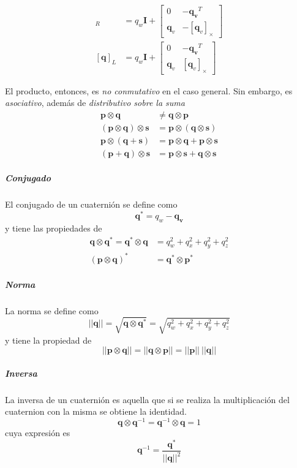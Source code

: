 \begin{align}
    [\bm{q}]_R &= q_w\bm{I} +
    \begin{bmatrix}
        0 & -\bm{q_v}^T \\
        \bm{q}_v & -[\bm{q}_v]_\times
    \end{bmatrix}
    \label{eq:quaternionproductmatrixright}
    \\
    [\bm{q}]_L &= q_w\bm{I} +
    \begin{bmatrix}
        0 & -\bm{q_v}^T \\
        \bm{q}_v & [\bm{q}_v]_\times
    \end{bmatrix}
    \label{eq:quaternionproductmatrixleft}
\end{align}

El producto, entonces, es \textit{no conmutativo} en el caso general. Sin embargo, es \textit{asociativo}, además de \textit{distributivo sobre la suma}
\begin{align}
    \bm{p}\otimes\bm{q} &\neq \bm{q}\otimes\bm{p} \\
    (\bm{p}\otimes\bm{q})\otimes\bm{s} &= \bm{p}\otimes(\bm{q}\otimes\bm{s}) \\
    \bm{p}\otimes(\bm{q} + \bm{s}) &= \bm{p}\otimes\bm{q} + \bm{p}\otimes\bm{s} \\
    (\bm{p} + \bm{q})\otimes\bm{s} &= \bm{p}\otimes\bm{s} + \bm{q}\otimes\bm{s}
\end{align}
\subparagraph{Conjugado}
El conjugado de un cuaternión se define como
\begin{equation}
    \bm{q}^* = q_w - \bm{q_v}
\end{equation}
y tiene las propiedades de
\begin{align}
    \bm{q}\otimes\bm{q}^* = \bm{q^*}\otimes\bm{q} &= q_w^2 + q_x^2 + q_y^2 + q_z^2 \\
    (\bm{p}\otimes\bm{q})^* &= \bm{q}^*\otimes\bm{p}^*
\end{align}

\subparagraph{Norma}
La norma se define como
\begin{equation}
    ||\bm{q}|| = \sqrt{\bm{q}\otimes\bm{q}^*} = \sqrt{q_w^2 + q_x^2 + q_y^2 + q_z^2}
\end{equation}
y tiene la propiedad de
\begin{equation}
    ||\bm{p}\otimes\bm{q}|| = ||\bm{q}\otimes\bm{p}|| = ||\bm{p}|| \ ||\bm{q}||
\end{equation}

\subparagraph{Inversa}
La inversa de un cuaternión es aquella que si se realiza la multiplicación del cuaternion con la misma se obtiene la identidad.
\begin{equation}
    \bm{q}\otimes\bm{q}^{-1} = \bm{q}^{-1}\otimes\bm{q} = 1
    \label{eq:quaternioninverse}
\end{equation}
cuya expresión es
\begin{equation}
    \bm{q}^{-1} = \frac{\bm{q}^*}{||\bm{q}||^2}
\end{equation}

